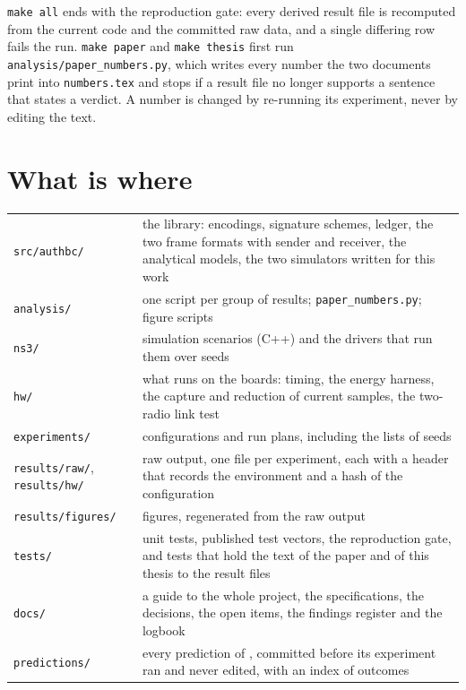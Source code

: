 \texttt{make all} ends with the reproduction gate: every derived result file is recomputed from
the current code and the committed raw data, and a single differing row fails the run.
\texttt{make paper} and \texttt{make thesis} first run \texttt{analysis/paper\_numbers.py},
which writes every number the two documents print into \texttt{numbers.tex} and stops if a
result file no longer supports a sentence that states a verdict. A number is changed by
re-running its experiment, never by editing the text.

\section{What is where}

{\small
\noindent\begin{tabularx}{\textwidth}{@{}l Y@{}}
\toprule
\texttt{src/authbc/} & the library: encodings, signature schemes, ledger, the two frame formats
with sender and receiver, the analytical models, the two simulators written for this work \\
\texttt{analysis/} & one script per group of results; \texttt{paper\_numbers.py}; figure scripts \\
\texttt{ns3/} & simulation scenarios (C++) and the drivers that run them over seeds \\
\texttt{hw/} & what runs on the boards: timing, the energy harness, the capture and reduction
of current samples, the two-radio link test \\
\texttt{experiments/} & configurations and run plans, including the lists of seeds \\
\texttt{results/raw/}, \texttt{results/hw/} & raw output, one file per experiment, each with a
header that records the environment and a hash of the configuration \\
\texttt{results/figures/} & figures, regenerated from the raw output \\
\texttt{tests/} & unit tests, published test vectors, the reproduction gate, and tests that hold
the text of the paper and of this thesis to the result files \\
\texttt{docs/} & a guide to the whole project, the specifications, the decisions, the open
items, the findings register and the logbook \\
\texttt{predictions/} & every prediction of , committed before its experiment ran
and never edited, with an index of outcomes \\
\bottomrule
\end{tabularx}
}

